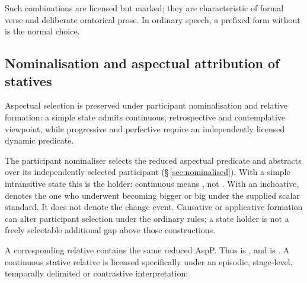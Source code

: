 \noindent Such combinations are licensed but marked; they are characteristic
of formal verse and deliberate oratorical prose. In ordinary speech, a
prefixed form without  is the normal choice.

\subsection{Nominalisation and aspectual attribution of statives}

Aspectual selection is preserved under participant nominalisation and
relative formation: a simple state admits continuous, retrospective and
contemplative viewpoint, while progressive and perfective require an
independently licensed dynamic predicate.

The participant nominaliser  selects the reduced aspectual
predicate and abstracts over its independently selected participant
(§\,\ref{sec:nominalised}). With a simple intransitive state this is the
holder: continuous  means , not
. With an inchoative,  denotes the one
who underwent becoming bigger or big under the supplied scalar standard.
It does not denote the change event. Causative or applicative formation can
alter participant selection under the ordinary rules; a state holder is not
a freely selectable additional gap above those constructions.

\pex
\a {}  
\a {}  
\a {}  
\a {}  
\xe

A corresponding  relative contains the same reduced AspP.
Thus  is , and
 is .
A continuous stative relative is licensed specifically under an episodic,
stage-level, temporally delimited or contrastive interpretation:

\pex
\a {}  
\a {}  
\a {} 
\xe


